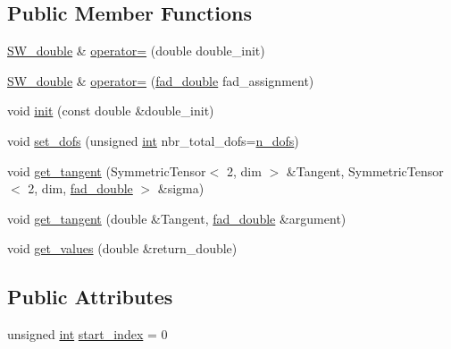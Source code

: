 \subsection*{Public Member Functions}
\begin{DoxyCompactItemize}
\item 
\hyperlink{classSacado__Wrapper_1_1SW__double}{S\+W\+\_\+double} \& \hyperlink{classSacado__Wrapper_1_1SW__double_a355de495ebe0e0b78ea4569fbb697717}{operator=} (double double\+\_\+init)
\item 
\hyperlink{classSacado__Wrapper_1_1SW__double}{S\+W\+\_\+double} \& \hyperlink{classSacado__Wrapper_1_1SW__double_ae9d242c29208f994f2eaabd9f5d5fa3c}{operator=} (\hyperlink{Sacado__example_8cc_a868b94676739e612d9c95940e70892a9}{fad\+\_\+double} fad\+\_\+assignment)
\item 
void \hyperlink{classSacado__Wrapper_1_1SW__double_adca799dd92dadebda9aebc91c797682a}{init} (const double \&double\+\_\+init)
\item 
void \hyperlink{classSacado__Wrapper_1_1SW__double_a36ced4218d40104fd8e548039a97cfb8}{set\+\_\+dofs} (unsigned \hyperlink{CMakeCache_8txt_a79a3d8790b2588b09777910863574e09}{int} nbr\+\_\+total\+\_\+dofs=\hyperlink{classSacado__Wrapper_1_1SW__double_a45e46904e5fd5be42bb4c9bb7454ffc5}{n\+\_\+dofs})
\item 
void \hyperlink{classSacado__Wrapper_1_1SW__double_a2e6eca4457eb22b06172bb5749038f1e}{get\+\_\+tangent} (Symmetric\+Tensor$<$ 2, dim $>$ \&Tangent, Symmetric\+Tensor$<$ 2, dim, \hyperlink{Sacado__example_8cc_a868b94676739e612d9c95940e70892a9}{fad\+\_\+double} $>$ \&sigma)
\item 
void \hyperlink{classSacado__Wrapper_1_1SW__double_a468303caab70c91f72bfe0547afff53a}{get\+\_\+tangent} (double \&Tangent, \hyperlink{Sacado__example_8cc_a868b94676739e612d9c95940e70892a9}{fad\+\_\+double} \&argument)
\item 
void \hyperlink{classSacado__Wrapper_1_1SW__double_ae7e9f33604ea736e485576447d78a46c}{get\+\_\+values} (double \&return\+\_\+double)
\end{DoxyCompactItemize}
\subsection*{Public Attributes}
\begin{DoxyCompactItemize}
\item 
unsigned \hyperlink{CMakeCache_8txt_a79a3d8790b2588b09777910863574e09}{int} \hyperlink{classSacado__Wrapper_1_1SW__double_aa0927ce06528899dd44afe5d770840c1}{start\+\_\+index} = 0
\end{DoxyCompactItemize}

